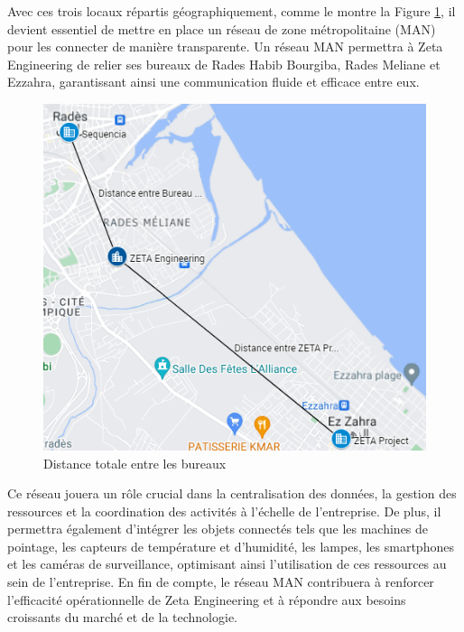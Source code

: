 Avec ces trois locaux répartis géographiquement, comme le montre la Figure \ref{Chap2.6.0}, il devient essentiel de mettre en place un réseau de zone métropolitaine (MAN) pour les connecter de manière transparente. Un réseau MAN permettra à Zeta Engineering de relier ses bureaux de Rades Habib Bourgiba, Rades Meliane et Ezzahra, garantissant ainsi une communication fluide et efficace entre eux. \\

\begin{figure}[H]
\centering
\includegraphics[width=16cm]{Images/DistanceTotal.png}
\caption{Distance totale entre les bureaux}
\label{Chap2.6.0}
\end{figure}

Ce réseau jouera un rôle crucial dans la centralisation des données, la gestion des ressources et la coordination des activités à l'échelle de l'entreprise. De plus, il permettra également d'intégrer les objets connectés tels que les machines de pointage, les capteurs de température et d'humidité, les lampes, les smartphones et les caméras de surveillance, optimisant ainsi l'utilisation de ces ressources au sein de l'entreprise. En fin de compte, le réseau MAN contribuera à renforcer l'efficacité opérationnelle de Zeta Engineering et à répondre aux besoins croissants du marché et de la technologie. \\






